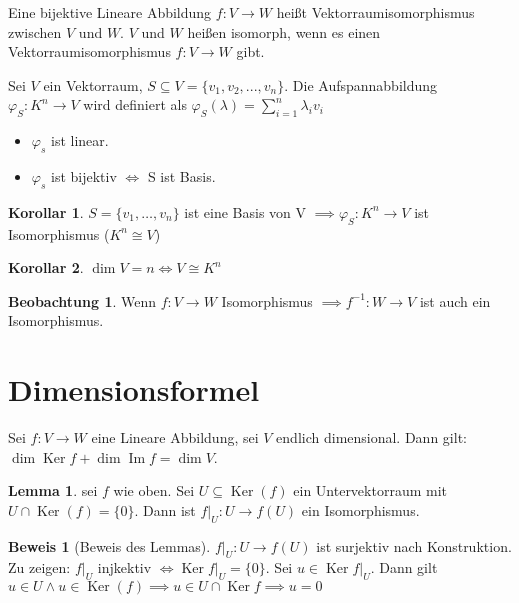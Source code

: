 \documentclass[oneside,fontsize=11pt,paper=a4,BCOR=0mm,DIV=12,automark,headsepline]{scrbook}
\DeclareMathOperator{\mdim}{dim}
\DeclareMathOperator{\mKer}{Ker}
\DeclareMathOperator{\mIm}{Im}
\theoremstyle{remark}
\theoremstyle{definition}
\newtheorem{beobachtung}{Beobachtung}
\newtheorem{lemma}{Lemma}[section]
\newtheorem*{korollar}{Korollar}
\theoremstyle{definition}
\newtheorem*{prof}{Beweis}
\theoremstyle{remark}
\begin{document}
\begin{definition}{}{}
Eine bijektive Lineare Abbildung \(f:V\rightarrow W\) heißt Vektorraumisomorphismus
zwischen \(V\) und \(W\). \(V\) und \(W\) heißen isomorph, wenn es einen
Vektorraumisomorphismus \(f: V\rightarrow W\) gibt.
\end{definition}

\begin{exa} \label{}
Sei \(V\) ein Vektorraum, \(S\subseteq V = \{v_1, v_2, ..., v_n\}\). Die
Aufspannabbildung $\varphi_S: K^n \rightarrow V$ wird definiert als $\varphi_S(\lambda)=\sum_{i=1}^{n}\lambda_i v_i$

\begin{itemize}
	\item \(\varphi_s\) ist linear.
	\item \(\varphi_s\) ist bijektiv \(\iff\) S ist Basis.
\end{itemize}
\end{exa}

\begin{korollar}
	\(S=\{v_1,\ldots,v_n\}\) ist eine Basis von V $\implies \varphi_S: K^n \rightarrow V$ ist Isomorphismus ($K^n\cong V$)
\end{korollar}

\begin{korollar}
	\(\dim V = n \iff V\cong K^n\)
\end{korollar}

\begin{beobachtung}
	Wenn \(f:V\rightarrow W\) Isomorphismus $\implies f^{-1}:W\rightarrow V $ ist auch ein Isomorphismus.
\end{beobachtung}

\section{Dimensionsformel}
\label{sec:org9a58004}
\begin{theo}{}{}
Sei \(f:V\to W\) eine Lineare Abbildung, sei \(V\) endlich dimensional. Dann gilt: \(\mdim\mKer f + \mdim\mIm f = \mdim V\).
\end{theo}

\begin{lemma} sei \(f\) wie oben. Sei \(U \subseteq \mKer(f)\) ein Untervektorraum mit \(U \cap \mKer(f) = \{0\}\).  Dann ist \(f|_U:U\to f(U)\) ein Isomorphismus.
\end{lemma}

\begin{prof}[Beweis des Lemmas] \label{}
\(f|_U:U\to f(U)\) ist surjektiv nach Konstruktion. Zu zeigen: \(f|_U\) injkektiv \(\iff \mKer f|_U = \{0\}\). Sei \(u\in \mKer f|_U \). Dann gilt \(u\in U \land u \in \mKer(f) \implies u \in U \cap \mKer f \implies u = 0\)
\end{prof}
\end{document}
